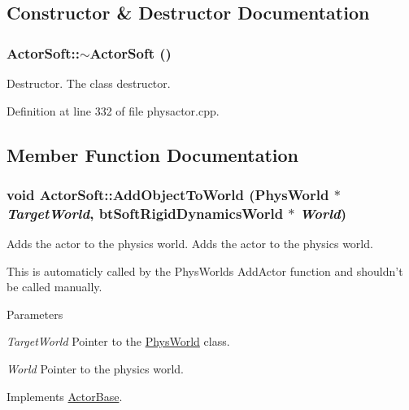 \subsection{Constructor \& Destructor Documentation}
\hypertarget{classActorSoft_af58881c064fa2182a2347eb8755696b0}{
\subsubsection[{$\sim$ActorSoft}]{\setlength{\rightskip}{0pt plus 5cm}ActorSoft::$\sim$ActorSoft ()}}
\label{d5/da4/classActorSoft_af58881c064fa2182a2347eb8755696b0}


Destructor. The class destructor. 

Definition at line 332 of file physactor.cpp.

\subsection{Member Function Documentation}
\hypertarget{classActorSoft_a0def29f28ed4d126a0634ddc97e33e2f}{
\subsubsection[{AddObjectToWorld}]{\setlength{\rightskip}{0pt plus 5cm}void ActorSoft::AddObjectToWorld ({\bf PhysWorld} $\ast$ {\em TargetWorld}, \/  btSoftRigidDynamicsWorld $\ast$ {\em World})}}
\label{d5/da4/classActorSoft_a0def29f28ed4d126a0634ddc97e33e2f}


Adds the actor to the physics world. Adds the actor to the physics world. \par
 This is automaticly called by the PhysWorlds AddActor function and shouldn't be called manually. 
\begin{DoxyParams}{Parameters}
\item[{\em TargetWorld}]Pointer to the \hyperlink{classPhysWorld}{PhysWorld} class. \item[{\em World}]Pointer to the physics world. \end{DoxyParams}


Implements \hyperlink{classActorBase_a1af82a2ed960fd114518fdf84d5ff146}{ActorBase}.

